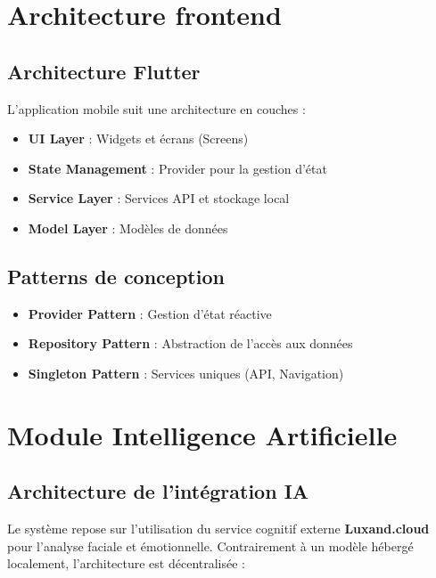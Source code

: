 \documentclass[a4paper,11pt]{report}
\begin{document}
\section{Architecture frontend}

\subsection{Architecture Flutter}

L'application mobile suit une architecture en couches :

\begin{itemize}
    \item \textbf{UI Layer} : Widgets et écrans (Screens)
    \item \textbf{State Management} : Provider pour la gestion d'état
    \item \textbf{Service Layer} : Services API et stockage local
    \item \textbf{Model Layer} : Modèles de données
\end{itemize}

\subsection{Patterns de conception}

\begin{itemize}
    \item \textbf{Provider Pattern} : Gestion d'état réactive
    \item \textbf{Repository Pattern} : Abstraction de l'accès aux données
    \item \textbf{Singleton Pattern} : Services uniques (API, Navigation)
\end{itemize}

\section{Module Intelligence Artificielle}

\subsection{Architecture de l'intégration IA}
Le système repose sur l'utilisation du service cognitif externe \textbf{Luxand.cloud} pour l'analyse faciale et émotionnelle. Contrairement à un modèle hébergé localement, l'architecture est décentralisée :
\end{document}
